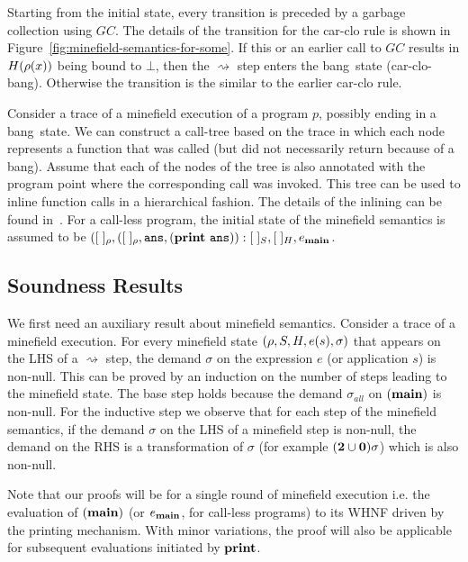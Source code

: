 \documentclass[preprint, 9pt]{sigplanconf}
\newcommand{\bang}{\mbox{\sc bang}}
\begin{document}
Starting from the initial state,
every transition  is preceded  by a  garbage collection
using $GC$.  The details of the transition for the {\sc
  car-clo}  rule   is  shown   in
Figure~\ref{fig:minefield-semantics-for-some}.  If  this  or  an
earlier  call to  $GC$  results  in $H(\rho(x))$  being
bound  to  $\bot$,  then  the  $\rightsquigarrow$  step
enters the  \bang\ state ({\sc  car-clo-bang}). Otherwise
the transition is the similar to the earlier {\sc car-clo}
rule. 



Consider a trace  of a minefield execution of a  program $p$, possibly
ending in  a \bang\ state. We  can construct a call-tree  based on the
trace in  which each node represents  a function that was  called (but
did not necessarily  return because of a \bang).  Assume  that each of
the nodes of  the tree is also annotated with  the program point where
the corresponding call  was invoked.  This tree can be  used to inline
function calls in a hierarchical fashion.  The details of the inlining
can be found in~\cite{asati14lgc}.
For  a
call-less program,  the initial state of  the minefield
semantics  is  assumed  to  be  $([\;]_\rho,([\;]_\rho,
\mathbf{\mbox{\tt ans}},      (\mathbf{print}~\mathbf{\mbox{\tt ans}})):[\;]_{S}     ,      [\;]_{H},
e_{\mathbf{main}}$.
   
 
\subsection{Soundness Results}
We first need an auxiliary  result about minefield semantics. Consider
a trace of  a minefield execution.  For every  minefield state $(\rho,
S,   H,  e(s),   \sigma)$   that   appears  on   the   LHS  of   a
$\rightsquigarrow$ step, the demand $\sigma$ on the expression $e$ (or
application $s$) is  non-null.  This can be proved by  an induction on
the number  of steps leading  to the  minefield state.  The  base step
holds   because  the   demand   $\sigma_{\mathit{all}}$   on  $(\mathbf{main})$   is
non-null. For the inductive step we  observe that for each step of the
minefield semantics, if the demand $\sigma$  on the LHS of a minefield
step  is non-null,  the  demand  on the  RHS  is  a transformation  of
$\sigma$ (for example $({\mathbf{2}}\cup\mathbf{0})\sigma$) which is also non-null.

Note that our proofs will be for a single round of minefield execution
i.e.  the evaluation of $(\mathbf{main})$ (or $e_{\mathbf{main}}$, for call-less
programs) to  its WHNF driven  by the printing mechanism.   With minor
variations,  the   proof  will  also  be   applicable  for  subsequent
evaluations initiated by $\mathbf{print}$.
\end{document}
